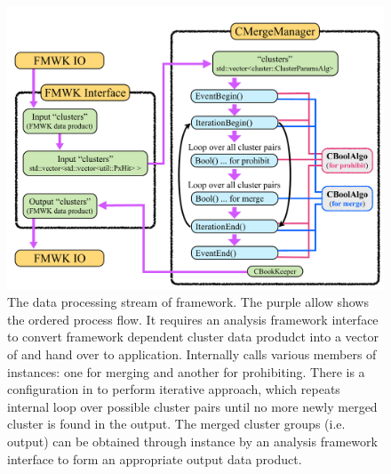 \begin{figure}[ht]\begin{center}
\includegraphics[width=13cm]{./src/Pictures/CMergeStream.pdf}
\caption{The data processing stream of {\cmerge} framework. The purple allow shows the ordered process flow. It requires an analysis framework interface to convert framework dependent cluster data produdct into a vector of {\pxhit} and hand over to {\cmerge} application. Internally {\cmerge} calls various members of {\cbalgo} instances: one for merging and another for prohibiting. There is a configuration in {\cmerge} to perform iterative approach, which repeats internal loop over possible cluster pairs until no more newly merged cluster is found in the output. The merged cluster groups (i.e. output) can be obtained through {\cbkeeper} instance by an analysis framework interface to form an appropriate output data product.}
\label{sec:fmwk:base:cmerge_stream}
\end{center}\end{figure}

